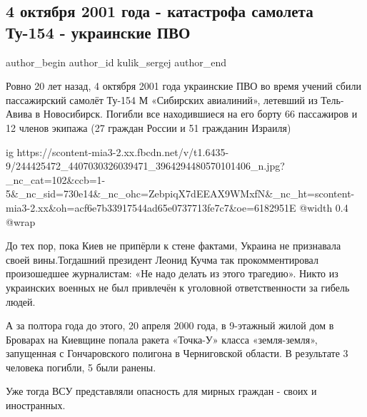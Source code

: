  
 
 
 
 
 
\subsection{4 октября 2001 года - катастрофа самолета Ту-154 - украинские ПВО}
\label{sec:04_10_2021.fb.kulik_sergej.1.katastrofa_tu_154_ukr_pvo_2001}
 
\ifcmt
 author_begin
   author_id kulik_sergej
 author_end
\fi

Ровно 20 лет назад, 4 октября 2001 года украинские ПВО во время учений сбили
пассажирский самолёт Ту-154 М «Сибирских авиалиний», летевший из Тель-Авива в
Новосибирск. Погибли все находившиеся на его борту 66 пассажиров и 12 членов
экипажа (27 граждан России и 51 гражданин Израиля)

\ifcmt
  ig https://scontent-mia3-2.xx.fbcdn.net/v/t1.6435-9/244425472_4407030326039471_3964294480570101406_n.jpg?_nc_cat=102&ccb=1-5&_nc_sid=730e14&_nc_ohc=ZebpiqX7dEEAX9WMxfN&_nc_ht=scontent-mia3-2.xx&oh=acf6e7b33917544ad65e0737713fe7c7&oe=6182951E
  @width 0.4
  @wrap 
\fi

До тех пор, пока Киев не припёрли к стене фактами, Украина не признавала своей
вины.Тогдашний президент Леонид Кучма так прокомментировал произошедшее
журналистам: «Не надо делать из этого трагедию». Никто из украинских военных не
был привлечён к уголовной ответственности за гибель людей.

А за полтора года до этого, 20 апреля 2000 года, в 9-этажный жилой дом в
Броварах на Киевщине попала ракета «Точка-У» класса «земля-земля», запущенная с
Гончаровского полигона в Черниговской области. В результате 3 человека погибли,
5 были ранены.

Уже тогда ВСУ представляли опасность для мирных граждан - своих и иностранных.

